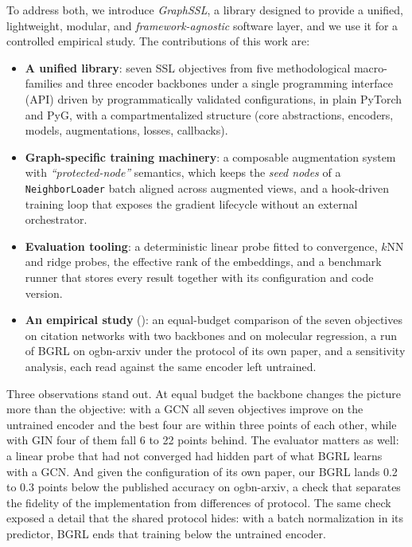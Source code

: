 \documentclass[conference]{IEEEtran}
\begin{document}
To address both, we introduce \textit{GraphSSL}, a library designed to provide a unified, lightweight, modular, and \textit{framework-agnostic} software layer, and we use it for a controlled empirical study. The contributions of this work are:
\begin{itemize}
    \item \textbf{A unified library}: seven SSL objectives from five methodological macro-families and three encoder backbones under a single programming interface (API) driven by programmatically validated configurations, in plain PyTorch and PyG, with a compartmentalized structure (core abstractions, encoders, models, augmentations, losses, callbacks).
    \item \textbf{Graph-specific training machinery}: a composable augmentation system with \textit{``protected-node''} semantics, which keeps the \textit{seed nodes} of a \texttt{NeighborLoader} batch aligned across augmented views, and a hook-driven training loop that exposes the gradient lifecycle without an external orchestrator.
    \item \textbf{Evaluation tooling}: a deterministic linear probe fitted to convergence, $k$NN and ridge probes, the effective rank of the embeddings, and a benchmark runner that stores every result together with its configuration and code version.
    \item \textbf{An empirical study} (): an equal-budget comparison of the seven objectives on citation networks with two backbones and on molecular regression, a run of BGRL on ogbn-arxiv under the protocol of its own paper, and a sensitivity analysis, each read against the same encoder left untrained.
\end{itemize}

Three observations stand out. At equal budget the backbone changes the picture more than the objective: with a GCN all seven objectives improve on the untrained encoder and the best four are within three points of each other, while with GIN four of them fall 6 to 22 points behind. The evaluator matters as well: a linear probe that had not converged had hidden part of what BGRL learns with a GCN. And given the configuration of its own paper, our BGRL lands 0.2 to 0.3 points below the published accuracy on ogbn-arxiv, a check that separates the fidelity of the implementation from differences of protocol. The same check exposed a detail that the shared protocol hides: with a batch normalization in its predictor, BGRL ends that training below the untrained encoder.
\end{document}
